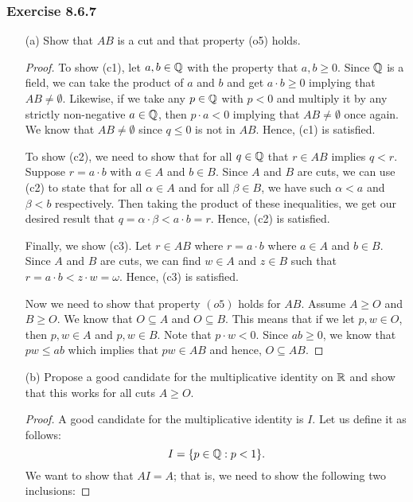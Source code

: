 \subsubsection{Exercise 8.6.7} 
\begin{enumerate}
    \item[(a)] Show that \( AB  \) is a cut and that property (o5) holds.
        \begin{proof}
        To show (c1), let \( a , b \in \mathbb{Q}  \) with the property that \( a,b \geq  0  \). Since \( \mathbb{Q} \) is a field, we can take the product of \( a  \) and \(  b  \) and get \( a \cdot b \geq 0  \) implying that \( AB \neq \emptyset \). Likewise, if we take any \( p \in \mathbb{Q}  \) with \( p < 0  \) and multiply it by any strictly non-negative \( a \in \mathbb{Q}  \), then \( p \cdot a < 0  \) implying that \( AB \neq \emptyset  \) once again. We know that \( AB \neq \emptyset  \) since \( q \leq  0  \) is not in \( A B  \). Hence, (c1) is satisfied.

    To show (c2), we need to show that for all \( q \in \mathbb{Q}  \) that \(  r \in A B  \) implies \( q < r  \). Suppose \( r = a \cdot b  \) with \( a \in A \) and \( b \in B  \). Since \( A   \) and \( B  \) are cuts, we can use (c2) to state that for all  \( \alpha \in A  \) and for all \( \beta \in B  \), we have such \(  \alpha < a   \) and \( \beta < b  \) respectively. Then taking the product of these inequalities, we get our desired result that \( q =  \alpha \cdot \beta < a \cdot b = r \). Hence, (c2) is satisfied.

    Finally, we show (c3). Let \( r \in AB  \) where \( r = a \cdot  b \) where \( a \in A  \) and \( b \in B \). Since \( A  \) and \( B  \) are cuts, we can find \(  w \in A  \) and \( z \in B  \) such that \( r = a \cdot b < z \cdot w = \omega \). Hence, (c3) is satisfied.

    Now we need to show that  property \( (o5)   \) holds for \( AB \). Assume \( A \geq O  \) and \( B \geq O  \). We know that \( O \subseteq A   \) and \(  O \subseteq B  \). This means that if we let \(  p, w \in O  \), then \( p, w \in A  \) and \( p, w  \in B  \). Note that \( p \cdot w < 0   \). Since \( ab \geq 0  \), we know that \( pw \leq ab  \) which implies that \( pw \in AB \) and hence, \( O \subseteq AB \).
        \end{proof}
    \item[(b)] Propose a good candidate for the multiplicative identity on \( \mathbb{R}  \) and show that this works for all cuts \( A \geq O  \).
        \begin{proof}
        A good candidate for the multiplicative identity is \( I  \). Let us define it as follows: 
        \[  I = \{ p \in \mathbb{Q} : p < 1 \}.  \] 
        We want to show that \( AI =A  \); that is, we need to show the following two inclusions:     


\end{proof}
\end{enumerate}
